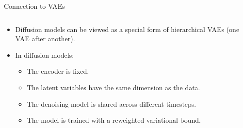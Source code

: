 \begin{frame}{Connection to VAEs}
\begin{columns}
    \begin{column}{0.7\textwidth}
    \begin{itemize}
        \setlength{\itemsep}{0.75em}
        \item Diffusion models can be viewed as a special form of hierarchical VAEs (one VAE after another).
        \item In diffusion models:
        \begin{itemize}
            \setlength{\itemsep}{0.5em}
            \item The encoder is fixed.
            \item The latent variables have the same dimension as the data.
            \item The denoising model is shared across different timesteps.
            \item The model is trained with a reweighted variational bound.
        \end{itemize}
    \end{itemize}
    \end{column}


\end{columns}
\end{frame}
